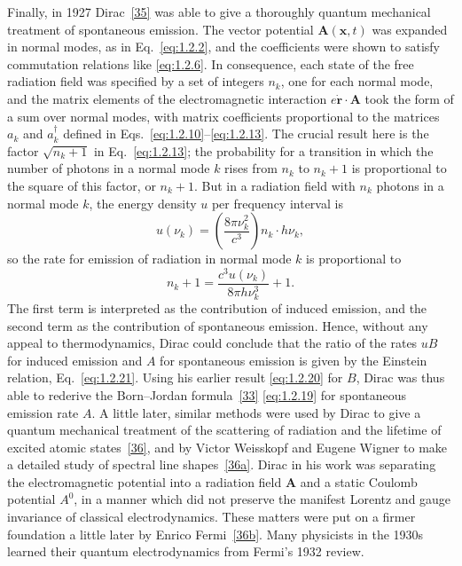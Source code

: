 Finally, in 1927 Dirac~\hyperref[ref:1.35]{[35]} was able to give a thoroughly quantum mechanical
treatment of spontaneous emission. The vector potential $\mathbf A(\mathbf x,t)$
was expanded in normal modes, as in Eq.~\eqref{eq:1.2.2}, and the coefficients were
shown to satisfy commutation relations like \eqref{eq:1.2.6}. In consequence, each
state of the free radiation field was specified by a set of integers $n_k$, one
for each normal mode, and the matrix elements of the electromagnetic
interaction $e\dot{\mathbf r}\cdot\mathbf A$ took the form of a sum over normal
modes, with matrix coefficients proportional to the matrices $a_k$ and
$a_k^{\dagger}$ defined in Eqs.~\eqref{eq:1.2.10}--\eqref{eq:1.2.13}. The crucial result here is
the factor $\sqrt{n_k+1}$ in Eq.~\eqref{eq:1.2.13}; the probability for a transition in
which the number of photons in a normal mode $k$ rises from $n_k$ to $n_k+1$
is proportional to the square of this factor, or $n_k+1$. But in a radiation
field with $n_k$ photons in a normal mode $k$, the energy density $u$ per
frequency interval is
\[
  u(\nu_k)=\left(\frac{8\pi\nu_k^2}{c^3}\right)n_k\cdot h\nu_k,
\]
so the rate for emission of radiation in normal mode $k$ is proportional to
\[
  n_k+1=\frac{c^3u(\nu_k)}{8\pi h\nu_k^3}+1.
\]
The first term is interpreted as the contribution of induced emission, and
the second term as the contribution of spontaneous emission. Hence, without
any appeal to thermodynamics, Dirac could conclude that the ratio of the rates
$uB$ for induced emission and $A$ for spontaneous emission is given by the
Einstein relation, Eq.~\eqref{eq:1.2.21}. Using his earlier result \eqref{eq:1.2.20} for $B$,
Dirac was thus able to rederive the Born--Jordan formula~\hyperref[ref:1.33]{[33]} \eqref{eq:1.2.19} for
spontaneous emission rate $A$. A little later, similar methods were used by
Dirac to give a quantum mechanical treatment of the scattering of radiation
and the lifetime of excited atomic states~\hyperref[ref:1.36]{[36]}, and by Victor Weisskopf and
Eugene Wigner to make a detailed study of spectral line shapes~\hyperref[ref:1.36a]{[36a]}. Dirac
in his work was separating the electromagnetic potential into a radiation
field $\mathbf A$ and a static Coulomb potential $A^0$, in a manner which did
not preserve the manifest Lorentz and gauge invariance of classical
electrodynamics. These matters were put on a firmer foundation a little later
by Enrico Fermi~\hyperref[ref:1.36b]{[36b]}. Many physicists in the 1930s learned their quantum
electrodynamics from Fermi's 1932 review.

